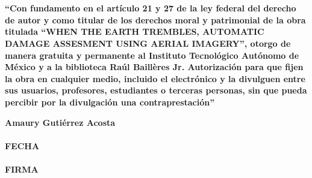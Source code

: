 \begin{titlepage}

\hfill\\
\hfill\\


\vspace{4cm}

\textbf{ ``Con fundamento en el art\'iculo 21 y 27 de la ley federal del derecho de autor y como titular de los derechos moral y patrimonial de la obra titulada ``WHEN THE EARTH TREMBLES, AUTOMATIC DAMAGE ASSESMENT USING AERIAL IMAGERY'', otorgo de manera gratuita y permanente al Instituto Tecnol\'ogico Aut\'onomo de M\'exico y a la biblioteca Ra\'ul Baill\`eres Jr. Autorizaci\'on para que fijen la obra en cualquier medio, incluido el electr\'onico y la divulguen entre sus usuarios, profesores, estudiantes o terceras personas, sin que pueda percibir por la divulgaci\'on una contraprestaci\'on''}

\vspace{1cm}
\begin{center}
\textbf{Amaury Guti\'errez Acosta}\\
\makebox[2in]{\hrulefill}\\
\textbf{FECHA}\\
\makebox[2in]{\hrulefill}\\
\textbf{FIRMA}\\
\end{center}
\medskip




\end{titlepage}
\endinput